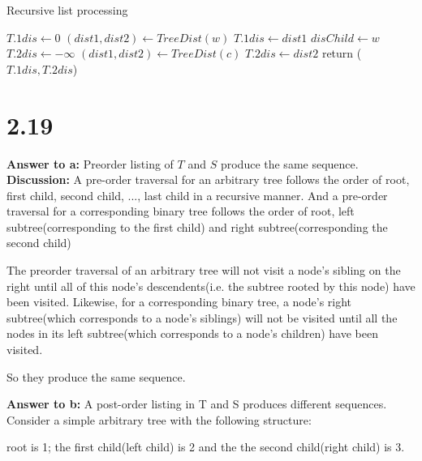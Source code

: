 \documentclass[a4paper,11pt]{article}
\theoremstyle{mytheor}
\begin{document}
\begin{algorithm}[H]
\caption{Recursive list processing}\label{sec:TREEEVALUATION_2_10}
\begin{algorithmic}[1]
  \State $T.1dis \gets 0$
    \State $(dist1, dist2) \gets TreeDist(w)$ 
      \State $T.1dis \gets dist1$
      \State $disChild \gets w$
    \EndIf
  \EndFor
  \State $T.2dis \gets -\infty$
    \State $(dist1, dist2) \gets TreeDist(c)$
      \State $T.2dis \gets dist2$
    \EndIf
  \EndFor
  \State return ($T.1dis, T.2dis$)
\EndFunction
\end{algorithmic}
\end{algorithm}

\vspace{1.2in}

\section*{2.19}
\noindent\textbf{Answer to a:} Preorder listing of $T$ and $S$ produce the same sequence.\\
\noindent\textbf{Discussion:} A pre-order traversal for an arbitrary tree follows the order of root, first child, second child, ..., last child in a recursive manner. And a pre-order traversal for a corresponding binary tree follows the order of root, left subtree(corresponding to the first child) and right subtree(corresponding the second child)

The preorder traversal of an arbitrary tree will not visit a node's sibling on the right until all of this node's descendents(i.e. the subtree rooted by this node) have been visited. Likewise, for a corresponding binary tree, a node's right subtree(which corresponds to a node's siblings) will not be visited until all the nodes in its left subtree(which corresponds to a node's children) have been visited.

So they produce the same sequence.

\vspace{1.2in}

\noindent\textbf{Answer to b:} A post-order listing in T and S produces different sequences. Consider a simple arbitrary tree with the following structure:

root is 1; the first child(left child) is 2 and the the second child(right child) is 3.
\end{document}

